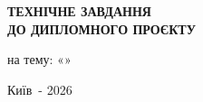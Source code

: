 \documentclass[%
  ukrainian, utf8, columnvii, simple,
  hpadding=10mm, vpadding=10mm, reduceheight=2mm,
  floatsection,
]{eskdtext}
\begin{document}
\thispagestyle{empty}
\vspace*{\fill}
\begin{center}
{\large\textbf{ТЕХНІЧНЕ ЗАВДАННЯ\\ДО ДИПЛОМНОГО ПРОЄКТУ}}

\vspace{1.2em}

на тему: «\textit{\thesisTitle}»
\end{center}
\vspace*{\fill}
\begin{center}
Київ~- 2026
\end{center}
\newpage


\tableofcontents
\newpage

\end{document}
